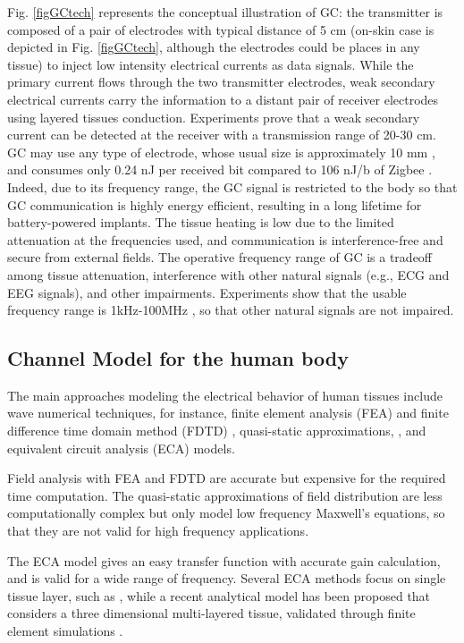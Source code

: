 Fig. \ref{figGCtech} represents the conceptual illustration of GC: the transmitter is composed of a pair of electrodes with typical distance of 5 cm (on-skin case is depicted in Fig. \ref{figGCtech}, although the electrodes could be places in any tissue) to inject low intensity electrical currents as data signals. While the primary current flows through the two transmitter electrodes, weak secondary electrical currents carry the information to a distant pair of receiver electrodes using layered tissues conduction. Experiments prove that a weak secondary current can be detected at the receiver with a transmission range of 20-30 cm. GC may use any type of electrode, whose usual size is approximately 10 mm \cite{Li2017}, and consumes only 0.24 nJ per received bit compared to 106 nJ/b of Zigbee \cite{Seyedi2013}. Indeed, due to its frequency range, the GC signal is restricted to the body so that GC communication is highly energy efficient, resulting in a long lifetime for battery-powered implants. The tissue heating is low due to the limited attenuation at the frequencies used, and communication is interference-free and secure from external fields.
The operative frequency range of GC is a tradeoff among tissue attenuation, interference with other natural signals (e.g., ECG and EEG signals), and other impairments. Experiments show that the usable frequency range is 1kHz-100MHz \cite{Callejon2014}, so that other natural signals are not impaired.

\subsection{Channel Model for the human body}
\label{GCChannel}
The main approaches modeling the electrical behavior of human tissues include
wave numerical techniques, for instance, finite element analysis (FEA) and finite difference time domain method (FDTD) \cite{Wegmueller2007,Song2012}, quasi-static approximations, \cite{Pun2011,Chen2012}, and equivalent circuit analysis (ECA) models.

Field analysis with FEA and FDTD are accurate but expensive for the required time computation.
The quasi-static approximations of field distribution are less computationally complex but only model low frequency Maxwell’s equations, so that they are not valid for high frequency applications.

The ECA model gives an easy transfer function with accurate gain calculation, and is valid for a wide range of frequency.
Several ECA methods focus on single tissue layer, such as \cite{Wegmueller2010}, while a recent analytical model has been proposed that considers a three dimensional multi-layered tissue, validated through finite element simulations \cite{Swaminathan2016}.

